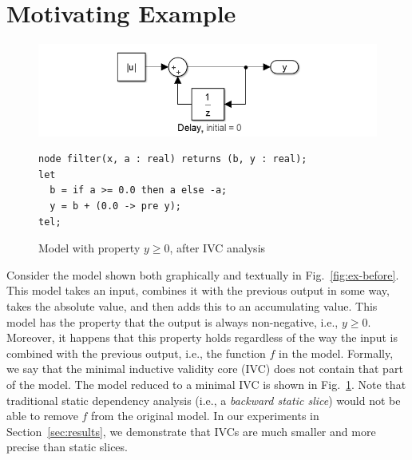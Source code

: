 \section{Motivating Example}
\label{sec:example}

\begin{figure}[t]
\includegraphics[width=\columnwidth]{figs/simulink-ivc.png}
{\small
\begin{verbatim}
node filter(x, a : real) returns (b, y : real);
let
  b = if a >= 0.0 then a else -a;
  y = b + (0.0 -> pre y);
tel;
\end{verbatim}
}
\vspace{-0.1in}
\caption{Model with property $y \geq 0$, after IVC analysis}
\label{fig:ex-after}
\end{figure}


Consider the model shown both graphically and textually in
Fig.~\ref{fig:ex-before}. This model takes an input, combines it
with the previous output in some way, takes the absolute value, and
then adds this to an accumulating value. This model has the property
that the output is always non-negative, i.e., $y \geq 0$. Moreover, it
happens that this property holds regardless of the way the input is
combined with the previous output, i.e., the function $f$ in the
model. Formally, we say that the minimal inductive validity core (IVC) does
not contain that part of the model. The model reduced to a minimal IVC
is shown in Fig.~\ref{fig:ex-after}. Note that traditional static
dependency analysis (i.e., a {\em backward static slice}) would not be able to
remove $f$ from the original model.  In our experiments in Section~\ref{sec:results},
we demonstrate that IVCs are much smaller and more precise than static slices.

